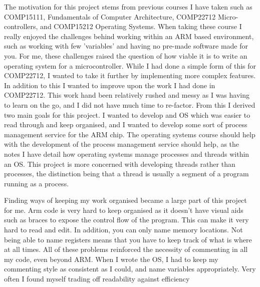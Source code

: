 \label{motivations}
The motivation for this project stems from previous courses I have taken such as COMP15111, Fundamentals of Computer Architecture, COMP22712 Micro-controllers, and COMP15212 Operating Systems. When taking these course I really enjoyed the challenges behind working within an ARM based environment, such as working with few 'variables' and having no pre-made software made for you. For me, these challenges raised the question of how viable it is to write an operating system for a microcontroller.
While I had done a simple form of this for COMP22712, I wanted to take it further by implementing more complex features. In addition to this I wanted to improve upon the work I had done in COMP22712. This work hand been relatively rushed and messy as I was having to learn on the go, and I did not have much time to re-factor. From this I derived two main goals for this project. I wanted to develop and OS which was easier to read through and keep organised, and I wanted to develop some sort of process management service for the ARM chip. The operating systems course should help with the development of the process management service should help, as the notes I have detail how operating systems manage processes and threads within an OS. This project is more concerned with developing threads rather than processes, the distinction being that a thread is usually a segment of a program running as a process. 

Finding ways of keeping my work organised became a large part of this project for me. Arm code is very hard to keep organised as it doesn't have visual aids such as braces to expose the control flow of the program. This can make it very hard to read and edit. In addition, you can only name memory locations. Not being able to name registers means that you have to keep track of what is where at all times. All of these problems reinforced the necessity of commenting in all my code, even beyond ARM. When I wrote the OS, I had to keep my commenting style as consistent as I could, and name variables appropriately. Very often I found myself trading off readability against efficiency 
